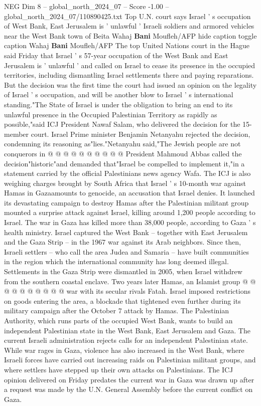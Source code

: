\begin{textsample}{NEG Dim 8 – global\_north\_2024\_07 – Score -1.00 – global\_north\_2024\_07/110890425.txt}  \label{ex:f8_neg_412}
Top U.N. court says Israel ' s occupation of West Bank, East Jerusalem is ' unlawful ' Israeli soldiers and armored vehicles near the West Bank town of Beita Wahaj \textbf{Bani} Moufleh/AFP hide caption toggle caption Wahaj \textbf{Bani} Moufleh/AFP The top United Nations court in the Hague said Friday that Israel ' s 57-year occupation of the West Bank and East Jerusalem is ' unlawful ' and called on Israel to cease its presence in the occupied territories, including dismantling Israel settlements there and paying reparations.
But the decision was the first time the court had issued an opinion on the legality of Israel ' s occupation, and will be another blow to Israel ' s international standing."The State of Israel is under the obligation to bring an end to its unlawful presence in the Occupied Palestinian Territory as rapidly as possible,"said ICJ President Nawaf Salam, who delivered the decision for the 15-member court.
Israel Prime minister Benjamin Netanyahu rejected the decision, condemning its reasoning as"lies."Netanyahu said,"The Jewish people are not conquerors in @ @ @ @ @ @ @ @ @ @ President Mahmoud Abbas called the decision"historic"and demanded that"Israel be compelled to implement it,"in a statement carried by the official Palestinians news agency Wafa.
The ICJ is also weighing charges brought by South Africa that Israel ' s 10-month war against Hamas in Gazaamounts to genocide, an accusation that Israel denies.
It launched its devastating campaign to destroy Hamas after the Palestinian militant group mounted a surprise attack against Israel, killing around 1,200 people according to Israel.
The war in Gaza has killed more than 38,000 people, according to Gaza ' s health ministry.
Israel captured the West Bank -- together with East Jerusalem and the Gaza Strip -- in the 1967 war against its Arab neighbors.
Since then, Israeli settlers -- who call the area Judea and Samaria -- have built communities in the region which the international community has long deemed illegal.
Settlements in the Gaza Strip were dismantled in 2005, when Israel withdrew from the southern coastal enclave.
Two years later Hamas, an Islamist group @ @ @ @ @ @ @ @ @ @ war with its secular rivals Fatah.
Israel imposed restrictions on goods entering the area, a blockade that tightened even further during its military campaign after the October 7 attack by Hamas.
The Palestinian Authority, which runs parts of the occupied West Bank, wants to build an independent Palestinian state in the West Bank, East Jerusalem and Gaza.
The current Israeli administration rejects calls for an independent Palestinian state.
While war rages in Gaza, violence has also increased in the West Bank, where Israeli forces have carried out increasing raids on Palestinian militant groups, and where settlers have stepped up their own attacks on Palestinians.
The ICJ opinion delivered on Friday predates the current war in Gaza was drawn up after a request was made by the U.N.
General Assembly before the current conflict on Gaza.

\end{textsample}
